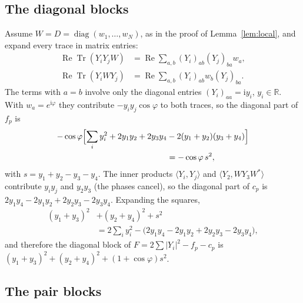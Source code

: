 \documentclass[aps,prd,twocolumn,superscriptaddress,nofootinbib,longbibliography,floatfix,amsmath,amssymb,10pt]{revtex4-2}
\theoremstyle{definition}
\theoremstyle{remark}
\newcommand{\R}{\mathbb{R}}
\newcommand{\ReTr}{\operatorname{Re}\operatorname{Tr}}
\newcommand{\ip}[2]{\langle #1,#2\rangle}
\begin{document}
\subsection{The diagonal blocks}

Assume $W=D=\operatorname{diag}(w_1,\dots,w_N)$, as in the proof of
Lemma~\ref{lem:local}, and expand every trace in matrix entries:
\[
\begin{aligned}
\ReTr(Y_iY_jW)&=\operatorname{Re}\sum_{a,b}(Y_i)_{ab}(Y_j)_{ba}w_a,\\
\ReTr(Y_iWY_j)&=\operatorname{Re}\sum_{a,b}(Y_i)_{ab}w_b(Y_j)_{ba}.
\end{aligned}
\]
The terms with $a=b$ involve only the diagonal entries $(Y_i)_{aa}=\mathrm
iy_i$, $y_i\in\R$. With $w_a=e^{\mathrm i\varphi}$ they contribute
$-y_iy_j\cos\varphi$ to both traces, so the diagonal part of $f_p$ is
\[
\begin{aligned}
-\cos\varphi\Bigl[\sum_iy_i^2+2y_1y_2+2y_3y_4&-2(y_1+y_2)(y_3+y_4)\Bigr]\\
&=-\cos\varphi\,s^2,
\end{aligned}
\]
with $s=y_1+y_2-y_3-y_4$. The inner products $\ip{Y_i}{Y_j}$ and
$\ip{Y_2}{WY_3W^*}$ contribute $y_iy_j$ and $y_2y_3$ (the phases cancel), so
the diagonal part of $c_p$ is $2y_1y_4-2y_1y_2+2y_2y_3-2y_3y_4$. Expanding the
squares,
\[
\begin{aligned}
(y_1+y_3)^2&+(y_2+y_4)^2+s^2\\
&=2\sum_iy_i^2-\bigl(2y_1y_4-2y_1y_2+2y_2y_3-2y_3y_4\bigr),
\end{aligned}
\]
and therefore the diagonal block of $F=2\sum|Y_i|^2-f_p-c_p$ is
$(y_1+y_3)^2+(y_2+y_4)^2+(1+\cos\varphi)s^2$.

\subsection{The pair blocks}
\end{document}

